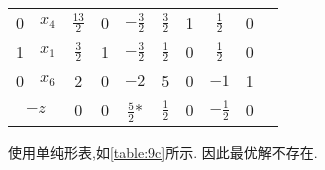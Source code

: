 \begin{enumerate}[label=\alph*)]
\begin{table}[ht]
\begin{tabular}{|c|c|c|c|c|c|c|c|c|c|}
                \hline

                0 & $x_4$ & $\tfrac{13}{2}$ & \multicolumn{1}{c}{0} & \multicolumn{1}{c}{\cellcolor{LightBlue1}$-\tfrac{3}{2}$} & \multicolumn{1}{c}{$\tfrac{3}{2}$} & \multicolumn{1}{c}{1} & \multicolumn{1}{c}{$\tfrac{1}{2}$} & 0 & \\
                \cline{1-3}
                1 & $x_1$ & $\tfrac{3}{2}$ & \multicolumn{1}{c}{1} & \multicolumn{1}{c}{\cellcolor{LightBlue1}$-\tfrac{3}{2}$} & \multicolumn{1}{c}{$\tfrac{1}{2}$} & \multicolumn{1}{c}{0} & \multicolumn{1}{c}{$\tfrac{1}{2}$} & 0 & \\
                \cline{1-3}
                0 & $x_6$ & 2 & \multicolumn{1}{c}{0} & \multicolumn{1}{c}{\cellcolor{LightBlue1}$-2$} & \multicolumn{1}{c}{5} & \multicolumn{1}{c}{0} & \multicolumn{1}{c}{$-1$} & 1 & \\
                \hline
                \multicolumn{2}{|c|}{$-z$} & 0 & \multicolumn{1}{c}{0} & \multicolumn{1}{c}{\cellcolor{LightBlue1}\color{red}$\tfrac{5}{2}$*} & \multicolumn{1}{c}{$\tfrac{1}{2}$} & \multicolumn{1}{c}{0} & \multicolumn{1}{c}{$-\tfrac{1}{2}$} & 0 & \\

                \hline
            \end{tabular}
        \end{table}
        使用单纯形表,如\cref{table:9c}所示.
        因此最优解不存在.
\end{enumerate}

